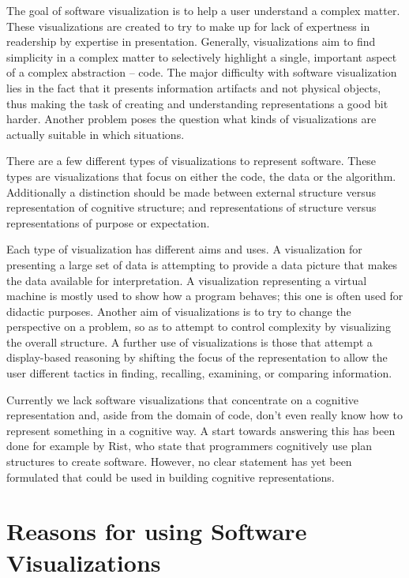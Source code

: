 \documentclass[11pt, a4paper, ngerman, twoside]{article}
\theoremstyle{plain}\newtheorem{Lemma}{Lemma}
\theoremstyle{plain}\newtheorem{Satz}[Lemma]{Satz}
\theoremstyle{definition}\newtheorem{Definition}[Lemma]{Definition}
\theoremstyle{definition}\newtheorem*{Beispiel}{Beispiel}
\theoremstyle{remark}\newtheorem*{Bemerkung}{Bemerkung}
\begin{document}
The goal of software visualization is to help a user understand a complex matter. These visualizations are created to try to make up for lack of expertness in readership by expertise in presentation. Generally, visualizations aim to find simplicity in a complex matter to selectively highlight a single, important aspect of a complex abstraction – code. The major difficulty with software visualization lies in the fact that it presents information artifacts and not physical objects, thus making the task of creating and understanding representations a good bit harder. Another problem poses the question what kinds of visualizations are actually suitable in which situations.

There are a few different types of visualizations to represent software. These types are visualizations that focus on either the code, the data or the algorithm\cite{myers}. Additionally a distinction should be made between external structure versus representation of cognitive structure; and representations of structure versus representations of purpose or expectation\cite{origin}.

Each type of visualization has different aims and uses. A visualization for presenting a large set of data is attempting to provide a data picture that makes the data available for interpretation. A visualization representing a virtual machine is mostly used to show how a program behaves; this one is often used for didactic purposes. Another aim of visualizations is to try to change the perspective on a problem, so as to attempt to control complexity by visualizing the overall structure. A further use of visualizations is those that attempt a display-based reasoning by shifting the focus of the representation to allow the user different tactics in finding, recalling, examining, or comparing information\cite{davies1993}\cite{davies1996}.

Currently we lack software visualizations that concentrate on a cognitive representation and, aside from the domain of code, don't even really know how to represent something in a cognitive way. A start towards answering this has been done for example by Rist\cite{rist1996}, who state that programmers cognitively use plan structures to create software. However, no clear statement has yet been formulated that could be used in building cognitive representations.

\section{Reasons for using Software Visualizations}
\end{document}
